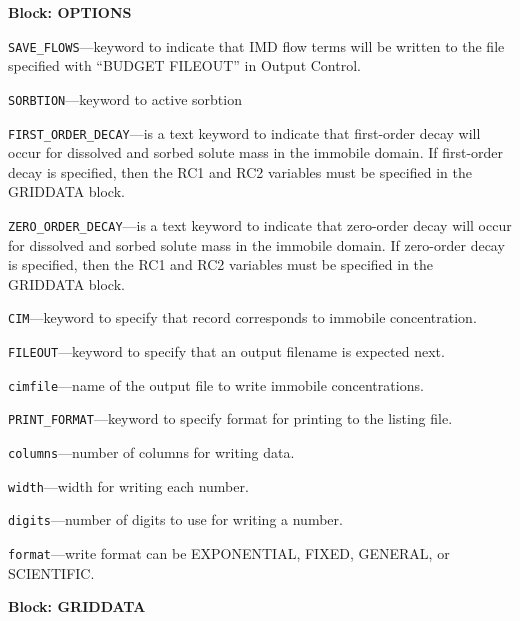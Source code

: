 
\item \textbf{Block: OPTIONS}

\begin{description}
\item \texttt{SAVE\_FLOWS}---keyword to indicate that IMD flow terms will be written to the file specified with ``BUDGET FILEOUT'' in Output Control.

\item \texttt{SORBTION}---keyword to active sorbtion

\item \texttt{FIRST\_ORDER\_DECAY}---is a text keyword to indicate that first-order decay will occur for dissolved and sorbed solute mass in the immobile domain.  If first-order decay is specified, then the RC1 and RC2 variables must be specified in the GRIDDATA block.

\item \texttt{ZERO\_ORDER\_DECAY}---is a text keyword to indicate that zero-order decay will occur for dissolved and sorbed solute mass in the immobile domain. If zero-order decay is specified, then the RC1 and RC2 variables must be specified in the GRIDDATA block.

\item \texttt{CIM}---keyword to specify that record corresponds to immobile concentration.

\item \texttt{FILEOUT}---keyword to specify that an output filename is expected next.

\item \texttt{cimfile}---name of the output file to write immobile concentrations.

\item \texttt{PRINT\_FORMAT}---keyword to specify format for printing to the listing file.

\item \texttt{columns}---number of columns for writing data.

\item \texttt{width}---width for writing each number.

\item \texttt{digits}---number of digits to use for writing a number.

\item \texttt{format}---write format can be EXPONENTIAL, FIXED, GENERAL, or SCIENTIFIC.

\end{description}
\item \textbf{Block: GRIDDATA}

